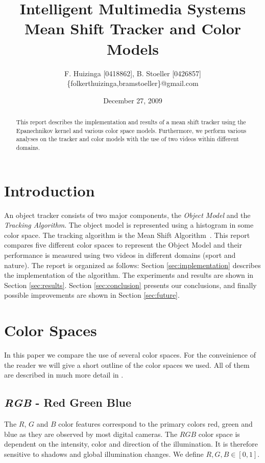 \documentclass[11pt]{article}
\title{Intelligent Multimedia Systems \\ Mean Shift Tracker and Color Models}
\author{F. Huizinga [0418862], B. Stoeller [0426857] \\
      \{folkerthuizinga,bramstoeller\}@gmail.com}
\date{December 27, 2009}
\begin{document}
\maketitle

\begin{abstract}
This report describes the implementation and results of a mean shift tracker
using the Epanechnikov kernel and various color space models. Furthermore, we
perform various analyses on the tracker and color models with the use of two
videos within different domains.
\end{abstract}


\section{Introduction} \label{sec:intro}
An object tracker consists of two major components, the \emph{Object Model} and
the \emph{Tracking Algorithm}. The object model is represented using a
histogram in some color space. The tracking algorithm is the Mean Shift
Algorithm~\cite{kernel-basedobject, real-timetracking}. This report compares
five different color spaces to represent the Object Model and their performance
is measured using two videos in different domains (sport and nature). The
report is organized as follows:  Section \ref{sec:implementation} describes the
implementation of the algorithm. The experiments and results are shown in
Section \ref{sec:results}. Section \ref{sec:conclusion} presents our
conclusions, and finally possible improvements are shown in Section
\ref{sec:future}.


\section{Color Spaces} \label{sec:color}
In this paper we compare the use of several color spaces. For the conveinience
of the reader we will give a short outline of the color spaces we used. All of
them are described in much more detail in \cite{Gevers}.

\subsection{\textit{RGB} - Red Green Blue}
The $R$, $G$ and $B$  color features correspond to the primary colors red,
green and blue as they are observed by most digital cameras. The
$RGB$ color space is dependent on the intensity, color and direction of the
illumination. It is therefore sensitive to shadows and global illumination
changes. We define $R, G, B \in [0,1]$.
\end{document}
